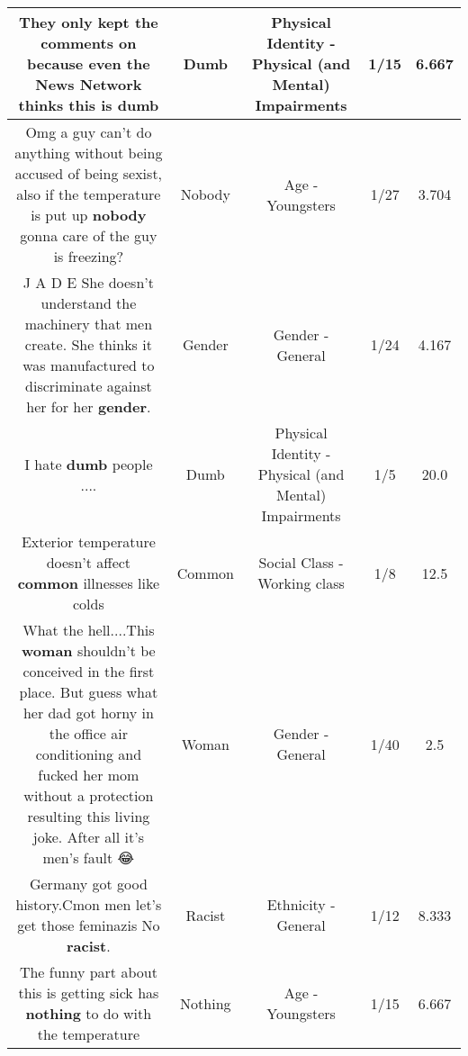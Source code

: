 \documentclass[11pt]{article}
\newlength\mylength
\begin{document}
\begin{center}
\begin{longtable}{|C{.65\mylength}|C{.30\mylength}|C{.12\mylength}|C{.12\mylength}|C{.12\mylength}|}
  \small They only kept the comments on because even the News Network thinks this is dumb\normalsize   & Dumb & Physical Identity - Physical (and Mental) Impairments & 1/15 & 6.667 \\  \hline
  \small Omg a guy can't do anything without being accused of being sexist, also if the temperature is put up \textbf{nobody} gonna care of the guy is freezing?\normalsize   & Nobody & Age - Youngsters & 1/27 & 3.704 \\  \hline
  \small J A D E She doesn't understand the machinery that men create. She thinks it was manufactured to discriminate against her for her \textbf{gender}.\normalsize   & Gender & Gender - General & 1/24 & 4.167 \\  \hline
  \small I hate \textbf{dumb} people ....\normalsize   & Dumb & Physical Identity - Physical (and Mental) Impairments & 1/5 & 20.0 \\  \hline
  \small Exterior temperature doesn't affect \textbf{common} illnesses like colds\normalsize   & Common & Social Class - Working class & 1/8 & 12.5 \\  \hline
  \small What the hell....This \textbf{woman} shouldn't  be conceived in the first place. But guess what her dad got horny in the office air conditioning and fucked her mom without a protection resulting this living joke. After all it's men's fault 😂\normalsize   & Woman & Gender - General & 1/40 & 2.5 \\  \hline
  \small Germany got good history.Cmon men let's get those feminazis No \textbf{racist}.\normalsize   & Racist & Ethnicity - General & 1/12 & 8.333 \\  \hline
  \small The funny part about this is getting sick has \textbf{nothing} to do with the temperature\normalsize   & Nothing & Age - Youngsters & 1/15 & 6.667 \\  \hline

\end{longtable}
\end{center}
\end{document}
